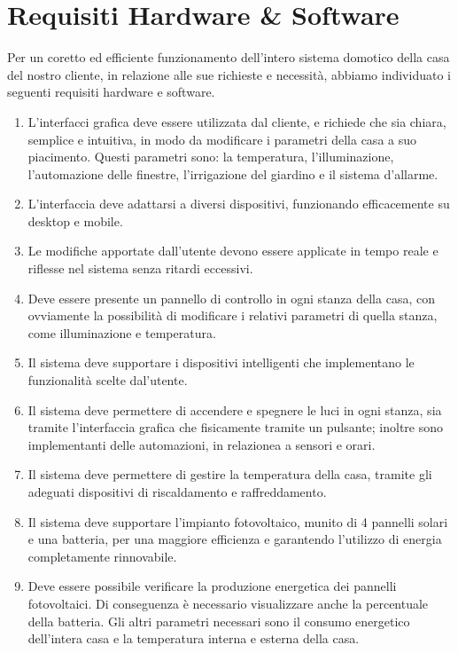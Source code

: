 \documentclass[italian, 12pt, a4paper]{article}
\begin{document}
\section{Requisiti Hardware \& Software}\label{sec:requisiti}
Per un coretto ed efficiente funzionamento dell'intero sistema domotico della casa del nostro cliente, in relazione alle sue richieste e necessità, abbiamo individuato i seguenti requisiti hardware e software.
\begin{enumerate}
    \item L'interfacci grafica deve essere utilizzata dal cliente, e richiede che sia chiara, semplice e intuitiva, in modo da modificare i parametri della casa a suo piacimento. Questi parametri sono: la temperatura, l'illuminazione, l'automazione delle finestre, l'irrigazione del giardino e il sistema d'allarme.
    \item L’interfaccia deve adattarsi a diversi dispositivi, funzionando efficacemente su desktop e mobile.
    \item Le modifiche apportate dall’utente devono essere applicate in tempo reale e riflesse nel sistema senza ritardi eccessivi.
    \item Deve essere presente un pannello di controllo in ogni stanza della casa, con ovviamente la possibilità di modificare i relativi parametri di quella stanza, come illuminazione e temperatura.
    \item Il sistema deve supportare i dispositivi intelligenti che implementano le funzionalità scelte dal'utente.
    \item Il sistema deve permettere di accendere e spegnere le luci in ogni stanza, sia tramite l'interfaccia grafica che fisicamente tramite un pulsante; inoltre sono implementanti delle automazioni, in relazionea a sensori e orari.
    \item Il sistema deve permettere di gestire la temperatura della casa, tramite gli adeguati dispositivi di riscaldamento e raffreddamento.
    \item Il sistema deve supportare l'impianto fotovoltaico, munito di 4 pannelli solari e una batteria, per una maggiore efficienza e garantendo l’utilizzo di energia completamente rinnovabile.
    \item Deve essere possibile verificare la produzione energetica dei pannelli fotovoltaici. Di conseguenza è necessario visualizzare anche la percentuale della batteria. Gli altri parametri necessari sono il consumo energetico dell’intera casa e la temperatura interna e esterna della casa.
\end{enumerate}
\clearpage
\end{document}
